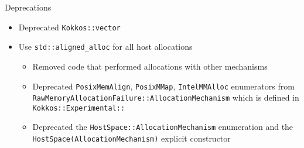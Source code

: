 \begin{frame}[fragile]{Deprecations}
\begin{itemize}
\item Deprecated \texttt{Kokkos::vector}
\item Use \texttt{std::aligned\_alloc} for all host allocations
\begin{itemize}
\item Removed code that performed allocations with other mechanisms
\item Deprecated \texttt{PosixMemAlign}, \texttt{PosixMMap},
      \texttt{IntelMMAlloc} enumerators from
      \texttt{RawMemoryAllocationFailure::AllocationMechanism}
      which is defined in \texttt{Kokkos::Experimental::}
\item Deprecated the \texttt{HostSpace::AllocationMechanism} enumeration and
      the \texttt{HostSpace(AllocationMechanism)} explicit constructor
\end{itemize}
\end{itemize}
\end{frame}


